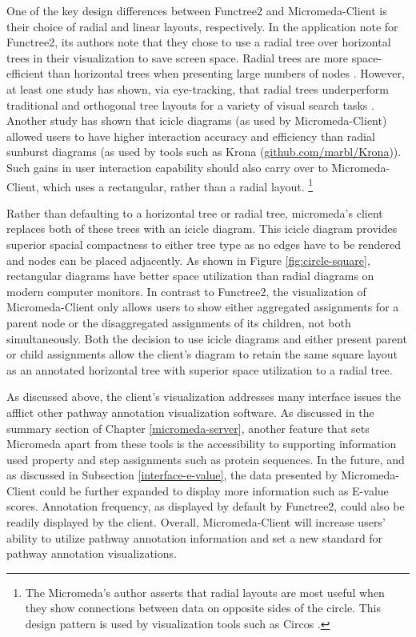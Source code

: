 One of the key design differences between Functree2 and Micromeda-Client is their choice of radial and linear layouts, respectively. In the application note for Functree2, its authors note that they chose to use a radial tree over horizontal trees in their visualization to save screen space. Radial trees are more space-efficient than horizontal trees when presenting large numbers of nodes \cite{burch2011evaluation}. However, at least one study has shown, via eye-tracking, that radial trees underperform traditional and orthogonal tree layouts for a variety of visual search tasks \cite{burch2011evaluation}. Another study has shown that icicle diagrams (as used by Micromeda-Client) allowed users to have higher interaction accuracy and efficiency \cite{muramalla2017radial} than radial sunburst diagrams (as used by tools such as Krona \cite{ondov2011interactive} (\href{github.com/marbl/Krona}{github.com/marbl/Krona})).
Such gains in user interaction capability should also carry over to Micromeda-Client, which uses a rectangular, rather than a radial layout. \footnote{The Micromeda's author asserts that radial layouts are most useful when they show connections between data on opposite sides of the circle. This design pattern is used by visualization tools such as Circos \cite{krzywinski2009circos}.} 

Rather than defaulting to a horizontal tree or radial tree, micromeda's client replaces both of these trees with an icicle diagram. This icicle diagram provides superior spacial compactness to either tree type as no edges have to be rendered and nodes can be placed adjacently. As shown in Figure \ref{fig:circle-square}, rectangular diagrams have better space utilization than radial diagrams on modern computer monitors. In contrast to Functree2, the visualization of Micromeda-Client only allows users to show either aggregated assignments for a parent node or the disaggregated assignments of its children, not both simultaneously. Both the decision to use icicle diagrams and either present parent or child assignments allow the client's diagram to retain the same square layout as an annotated horizontal tree with superior space utilization to a radial tree. 

As discussed above, the client's visualization addresses many interface issues the afflict other pathway annotation visualization software. As discussed in the summary section of Chapter \ref{micromeda-server}, another feature that sets Micromeda apart from these tools is the accessibility to supporting information used property and step assignments such as protein sequences. In the future, and as discussed in Subsection \ref{interface-e-value}, the data presented by Micromeda-Client could be further expanded to display more information such as E-value scores. Annotation frequency, as displayed by default by Functree2, could also be readily displayed by the client. Overall, Micromeda-Client will increase users' ability to utilize pathway annotation information and set a new standard for pathway annotation visualizations.